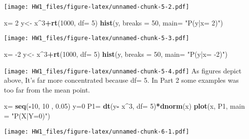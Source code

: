\documentclass[]{article}
\newenvironment{Shaded}{\begin{snugshade}}{\end{snugshade}}
\newcommand{\DataTypeTok}[1]{\textcolor[rgb]{0.13,0.29,0.53}{#1}}
\newcommand{\DecValTok}[1]{\textcolor[rgb]{0.00,0.00,0.81}{#1}}
\newcommand{\FloatTok}[1]{\textcolor[rgb]{0.00,0.00,0.81}{#1}}
\newcommand{\KeywordTok}[1]{\textcolor[rgb]{0.13,0.29,0.53}{\textbf{#1}}}
\newcommand{\NormalTok}[1]{#1}
\newcommand{\OperatorTok}[1]{\textcolor[rgb]{0.81,0.36,0.00}{\textbf{#1}}}
\newcommand{\StringTok}[1]{\textcolor[rgb]{0.31,0.60,0.02}{#1}}
\begin{document}
\texttt{[image: HW1\_files/figure-latex/unnamed-chunk-5-2.pdf]}

\begin{Shaded}
\begin{Highlighting}[]
\NormalTok{x=}\StringTok{ }\DecValTok{2}
\NormalTok{y<-}\StringTok{ }\NormalTok{x}\OperatorTok{^}\DecValTok{3}\OperatorTok{+}\KeywordTok{rt}\NormalTok{(}\DecValTok{1000}\NormalTok{, }\DataTypeTok{df=} \DecValTok{5}\NormalTok{)}
\KeywordTok{hist}\NormalTok{(y, }\DataTypeTok{breaks =}  \DecValTok{50}\NormalTok{, }\DataTypeTok{main=} \StringTok{"P(y|x= 2)"}\NormalTok{)}
\end{Highlighting}
\end{Shaded}

\texttt{[image: HW1\_files/figure-latex/unnamed-chunk-5-3.pdf]}

\begin{Shaded}
\begin{Highlighting}[]
\NormalTok{x=}\StringTok{ }\DecValTok{-2}
\NormalTok{y<-}\StringTok{ }\NormalTok{x}\OperatorTok{^}\DecValTok{3}\OperatorTok{+}\KeywordTok{rt}\NormalTok{(}\DecValTok{1000}\NormalTok{, }\DataTypeTok{df=} \DecValTok{5}\NormalTok{)}
\KeywordTok{hist}\NormalTok{(y, }\DataTypeTok{breaks =}  \DecValTok{50}\NormalTok{, }\DataTypeTok{main=} \StringTok{"P(y|x= -2)"}\NormalTok{)}
\end{Highlighting}
\end{Shaded}

\texttt{[image: HW1\_files/figure-latex/unnamed-chunk-5-4.pdf]} As
figures depict above, It's far more concentrated because df= 5. In Part
2 some examples was too far from the mean point.

\begin{Shaded}
\begin{Highlighting}[]
\NormalTok{x=}\StringTok{ }\KeywordTok{seq}\NormalTok{(}\OperatorTok{-}\DecValTok{10}\NormalTok{, }\DecValTok{10}\NormalTok{ , }\FloatTok{0.05}\NormalTok{)}
\NormalTok{y=}\DecValTok{0}
\NormalTok{P1=}\StringTok{ }\KeywordTok{dt}\NormalTok{(y}\OperatorTok{-}\StringTok{ }\NormalTok{x}\OperatorTok{^}\DecValTok{3}\NormalTok{, }\DataTypeTok{df=} \DecValTok{5}\NormalTok{)}\OperatorTok{*}\KeywordTok{dnorm}\NormalTok{(x)}
\KeywordTok{plot}\NormalTok{(x, P1, }\DataTypeTok{main =} \StringTok{"P(X|Y=0)"}\NormalTok{)}
\end{Highlighting}
\end{Shaded}

\texttt{[image: HW1\_files/figure-latex/unnamed-chunk-6-1.pdf]}
\end{document}
